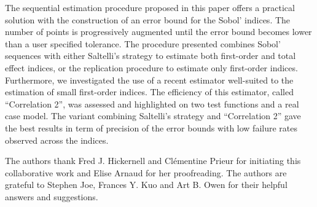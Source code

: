 The sequential estimation procedure proposed in this paper offers a practical solution with the construction of an error bound for the Sobol' indices. The number of points is progressively augmented until the error bound becomes lower than a user specified tolerance. The procedure presented combines Sobol' sequences with either Saltelli's strategy to estimate both first-order and total effect indices, or the replication procedure to estimate only first-order indices. Furthermore, we investigated the use of a recent estimator well-suited to the estimation of small first-order indices. The efficiency of this estimator, called ``Correlation 2'', was assessed and highlighted on two test functions and a real case model. The variant combining Saltelli's strategy and ``Correlation 2'' gave the best results in term of precision of the error bounds with low failure rates observed across the indices. 

\begin{acknowledgements}
The authors thank Fred J. Hickernell and Cl\'ementine Prieur for initiating this collaborative work and Elise Arnaud for her proofreading. The authors are grateful to Stephen Joe, Frances Y. Kuo and Art B. Owen for their helpful answers and suggestions.   
\end{acknowledgements}


